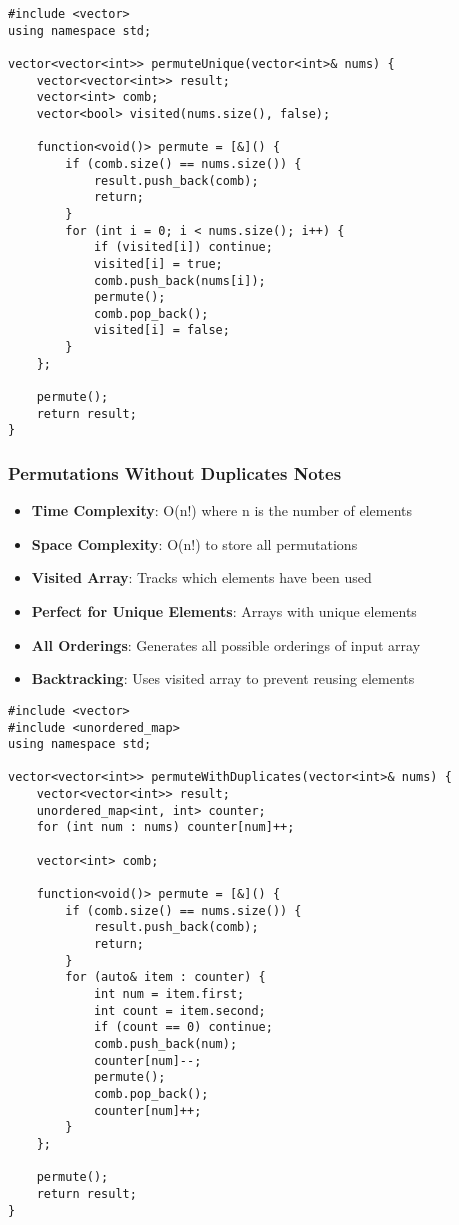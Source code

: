 \documentclass[11pt,a4paper]{article}
\begin{document}
\begin{lstlisting}[caption={Permutations Without Duplicates}]
#include <vector>
using namespace std;

vector<vector<int>> permuteUnique(vector<int>& nums) {
    vector<vector<int>> result;
    vector<int> comb;
    vector<bool> visited(nums.size(), false);

    function<void()> permute = [&]() {
        if (comb.size() == nums.size()) {
            result.push_back(comb);
            return;
        }
        for (int i = 0; i < nums.size(); i++) {
            if (visited[i]) continue;
            visited[i] = true;
            comb.push_back(nums[i]);
            permute();
            comb.pop_back();
            visited[i] = false;
        }
    };

    permute();
    return result;
}
\end{lstlisting}

\subsubsection{Permutations Without Duplicates Notes}
\begin{itemize}
\item \textbf{Time Complexity}: O(n!) where n is the number of elements
\item \textbf{Space Complexity}: O(n!) to store all permutations
\item \textbf{Visited Array}: Tracks which elements have been used
\item \textbf{Perfect for Unique Elements}: Arrays with unique elements
\item \textbf{All Orderings}: Generates all possible orderings of input array
\item \textbf{Backtracking}: Uses visited array to prevent reusing elements
\end{itemize}

\newpage
\begin{lstlisting}[caption={Permutations With Duplicates}]
#include <vector>
#include <unordered_map>
using namespace std;

vector<vector<int>> permuteWithDuplicates(vector<int>& nums) {
    vector<vector<int>> result;
    unordered_map<int, int> counter;
    for (int num : nums) counter[num]++;

    vector<int> comb;

    function<void()> permute = [&]() {
        if (comb.size() == nums.size()) {
            result.push_back(comb);
            return;
        }
        for (auto& item : counter) {
            int num = item.first;
            int count = item.second;
            if (count == 0) continue;
            comb.push_back(num);
            counter[num]--;
            permute();
            comb.pop_back();
            counter[num]++;
        }
    };

    permute();
    return result;
}
\end{lstlisting}
\end{document}

